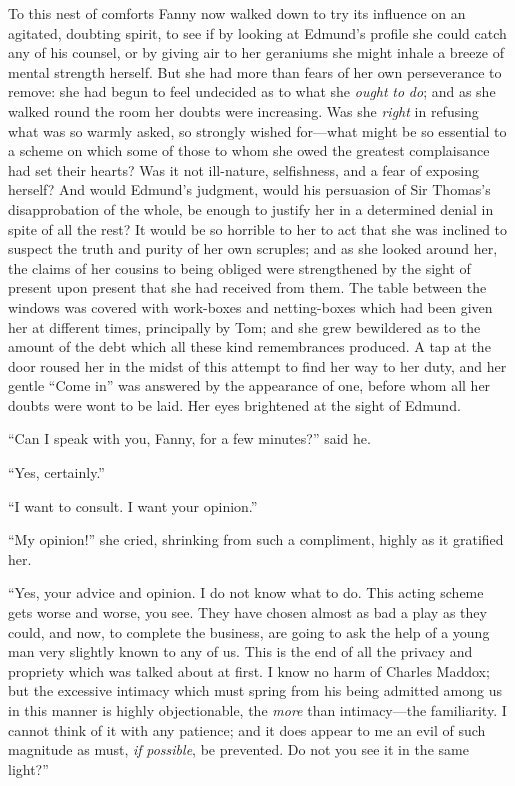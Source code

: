 To this nest of comforts Fanny now walked down to try
its influence on an agitated, doubting spirit, to see
if by looking at Edmund's profile she could catch any of
his counsel, or by giving air to her geraniums she might
inhale a breeze of mental strength herself.  But she had
more than fears of her own perseverance to remove:  she had
begun to feel undecided as to what she \emph{ought} \emph{to} \emph{do};
and as she walked round the room her doubts were increasing.
Was she \emph{right} in refusing what was so warmly asked,
so strongly wished for---what might be so essential
to a scheme on which some of those to whom she owed the
greatest complaisance had set their hearts?  Was it not
ill-nature, selfishness, and a fear of exposing herself?
And would Edmund's judgment, would his persuasion of Sir
Thomas's disapprobation of the whole, be enough to justify
her in a determined denial in spite of all the rest?
It would be so horrible to her to act that she was inclined
to suspect the truth and purity of her own scruples;
and as she looked around her, the claims of her cousins
to being obliged were strengthened by the sight of
present upon present that she had received from them.
The table between the windows was covered with work-boxes
and netting-boxes which had been given her at different times,
principally by Tom; and she grew bewildered as to the amount
of the debt which all these kind remembrances produced.
A tap at the door roused her in the midst of this attempt
to find her way to her duty, and her gentle ``Come in''
was answered by the appearance of one, before whom all her
doubts were wont to be laid.  Her eyes brightened at the
sight of Edmund.

``Can I speak with you, Fanny, for a few minutes?''
said he.

``Yes, certainly.''

``I want to consult.  I want your opinion.''

``My opinion!'' she cried, shrinking from such a compliment,
highly as it gratified her.

``Yes, your advice and opinion.  I do not know what to do.
This acting scheme gets worse and worse, you see.
They have chosen almost as bad a play as they could,
and now, to complete the business, are going to ask the
help of a young man very slightly known to any of us.
This is the end of all the privacy and propriety which was
talked about at first.  I know no harm of Charles Maddox;
but the excessive intimacy which must spring from his being
admitted among us in this manner is highly objectionable,
the \emph{more} than intimacy---the familiarity.  I cannot think
of it with any patience; and it does appear to me an evil
of such magnitude as must, \emph{if} \emph{possible}, be prevented.
Do not you see it in the same light?''

